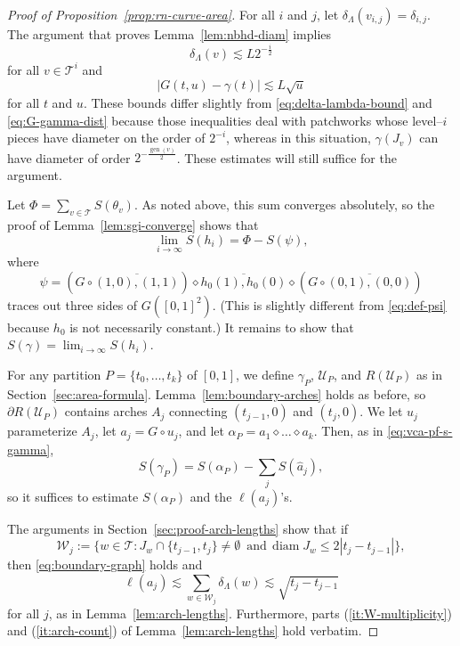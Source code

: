 \documentclass[12pt,reqno]{amsart}
\newcommand{\cT}{\mathcal{T}}
\newcommand{\cU}{\mathcal{U}}
\newcommand{\cW}{\mathcal{W}}
\DeclareMathOperator{\gen}{gen}
\theoremstyle{remark}
\newcommand{\0}{\mathbf{0}}
\renewcommand{\1}{\mathbf 1}
\DeclareMathOperator{\diam}{diam}
\begin{document}
\begin{proof}[Proof of Proposition~\ref{prop:rn-curve-area}]
  For all $i$ and $j$, let $\delta_\Lambda(v_{i,j}) = \delta_{i,j}$. The argument that proves Lemma~\ref{lem:nbhd-diam} implies
  \begin{equation}\label{eqn:EstimateDeltaLambdarn}
    \delta_\Lambda(v) \lesssim L 2^{-\frac{i}{2}}
  \end{equation}
  for all $v\in \cT^i$ and   
  \begin{equation}\label{eqn:Gtu}
    |G(t,u)-\gamma(t)|\lesssim L \sqrt{u}
  \end{equation}
  for all $t$ and $u$.  These bounds differ slightly from \eqref{eq:delta-lambda-bound} and \eqref{eq:G-gamma-dist} because those inequalities deal with patchworks whose level--$i$ pieces have diameter on the order of $2^{-i}$, whereas in this situation, $\gamma(J_v)$ can have diameter of order $2^{-\frac{\gen(v)}{2}}$. These estimates will still suffice for the argument.

  Let $\Phi = \sum_{v\in\cT} S(\theta_v)$. As noted above, this sum converges absolutely, so the proof of Lemma~\ref{lem:sgi-converge} shows that
  \[
    \lim_{i\to\infty} S(h_i)=\Phi-S(\psi),
  \]
  where
  $$\psi = (G\circ \overline{(1,0),(1,1)}) \diamond \overline{h_0(1), h_0(0)}\diamond (G\circ \overline{(0,1),(0,0)})$$
  traces out three sides of $G([0,1]^2)$.
  (This is slightly different from \eqref{eq:def-psi} because $h_0$ is not necessarily constant.)
  It remains to show that $S(\gamma) = \lim_{i\to \infty} S(h_i)$.

  For any partition $P=\{t_0,\dots,t_k\}$ of $[0,1]$, we define $\gamma_P$, $\cU_P$, and $R(\cU_P)$ as in Section~\ref{sec:area-formula}.
  Lemma~\ref{lem:boundary-arches} holds as before, so $\partial R(\cU_P)$ contains arches $A_j$ connecting $(t_{j-1},0)$ and $(t_j,0)$. We let $u_j$ parameterize $A_j$, let $a_j = G\circ u_j$, and let $\alpha_P = a_1\diamond \dots \diamond a_k$. Then, as in \eqref{eq:vca-pf-s-gamma}, 
  \begin{equation}\label{eq:s-gamma-s-alpha-rn}
    S(\gamma_P) = S(\alpha_P) - \sum_j S(\hat{a}_j),
  \end{equation}
  so it suffices to estimate $S(\alpha_P)$ and the $\ell(a_j)$'s.

  The arguments in Section~\ref{sec:proof-arch-lengths} show that if
  \begin{equation}\label{eq:def-cwjrn}
    \cW_j := \{w\in \cT : J_w\cap \{t_{j-1},t_j\} \ne \emptyset\, \text{ and}\, \diam J_w \leq 2|t_j-t_{j-1}|\},
  \end{equation}
  then \eqref{eq:boundary-graph} holds and 
  \begin{equation}\label{eq:alpha-length-rn}
    \ell(a_j) \lesssim \sum_{w\in \cW_j} \delta_\Lambda(w) \lesssim \sqrt{t_{j}- t_{j-1}}
  \end{equation}
  for all $j$, as in Lemma~\ref{lem:arch-lengths}. Furthermore, parts (\ref{it:W-multiplicity}) and (\ref{it:arch-count}) of Lemma~\ref{lem:arch-lengths} hold verbatim.


\end{proof}
\end{document}
